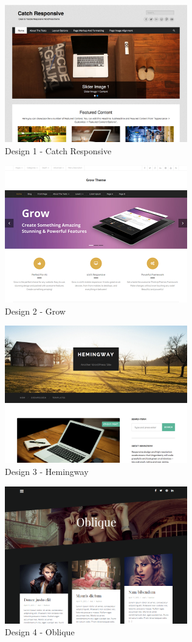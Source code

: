 \documentclass[a4paper,11pt,twoside,titlepage,openright]{report}
\numberwithin{equation}{section}		%
\numberwithin{figure}{section}			%
\numberwithin{table}{section}				%
\begin{document}
\begin{figure}[H]
\centering
\includegraphics[width=300px]{Images/Design_1.png}
\caption{Design 1 - Catch Responsive}
\end{figure}
\begin{figure}[H]
\centering
\includegraphics[width=300px]{Images/Design_2.png}
\caption{Design 2 - Grow}
\end{figure}
\begin{figure}[H]
\centering
\includegraphics[width=300px]{Images/Design_3.png}
\caption{Design 3 - Hemingway}
\end{figure}
\begin{figure}[H]
\centering
\includegraphics[width=300px]{Images/Design_4.png}
\caption{Design 4 - Oblique}
\end{figure}
\end{document}
